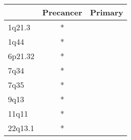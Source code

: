 \begin{tabular}{lcc}
\toprule
{} & Precancer & Primary \\
\midrule
1q21.3  &         * &         \\
1q44    &         * &         \\
6p21.32 &         * &         \\
7q34    &         * &         \\
7q35    &         * &         \\
9q13    &         * &         \\
11q11   &         * &         \\
22q13.1 &         * &         \\
\bottomrule
\end{tabular}
